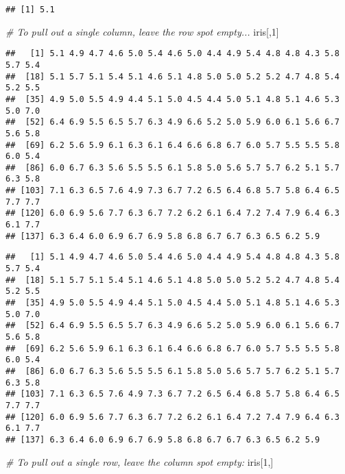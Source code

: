 \documentclass[]{article}
\newenvironment{Shaded}{\begin{snugshade}}{\end{snugshade}}
\newcommand{\DecValTok}[1]{\textcolor[rgb]{0.00,0.00,0.81}{#1}}
\newcommand{\CommentTok}[1]{\textcolor[rgb]{0.56,0.35,0.01}{\textit{#1}}}
\newcommand{\OperatorTok}[1]{\textcolor[rgb]{0.81,0.36,0.00}{\textbf{#1}}}
\newcommand{\NormalTok}[1]{#1}
\begin{document}
\begin{verbatim}
## [1] 5.1
\end{verbatim}

\begin{Shaded}
\begin{Highlighting}[]
\CommentTok{# To pull out a single column, leave the row spot empty...}
\NormalTok{iris[,}\DecValTok{1}\NormalTok{]}
\end{Highlighting}
\end{Shaded}

\begin{verbatim}
##   [1] 5.1 4.9 4.7 4.6 5.0 5.4 4.6 5.0 4.4 4.9 5.4 4.8 4.8 4.3 5.8 5.7 5.4
##  [18] 5.1 5.7 5.1 5.4 5.1 4.6 5.1 4.8 5.0 5.0 5.2 5.2 4.7 4.8 5.4 5.2 5.5
##  [35] 4.9 5.0 5.5 4.9 4.4 5.1 5.0 4.5 4.4 5.0 5.1 4.8 5.1 4.6 5.3 5.0 7.0
##  [52] 6.4 6.9 5.5 6.5 5.7 6.3 4.9 6.6 5.2 5.0 5.9 6.0 6.1 5.6 6.7 5.6 5.8
##  [69] 6.2 5.6 5.9 6.1 6.3 6.1 6.4 6.6 6.8 6.7 6.0 5.7 5.5 5.5 5.8 6.0 5.4
##  [86] 6.0 6.7 6.3 5.6 5.5 5.5 6.1 5.8 5.0 5.6 5.7 5.7 6.2 5.1 5.7 6.3 5.8
## [103] 7.1 6.3 6.5 7.6 4.9 7.3 6.7 7.2 6.5 6.4 6.8 5.7 5.8 6.4 6.5 7.7 7.7
## [120] 6.0 6.9 5.6 7.7 6.3 6.7 7.2 6.2 6.1 6.4 7.2 7.4 7.9 6.4 6.3 6.1 7.7
## [137] 6.3 6.4 6.0 6.9 6.7 6.9 5.8 6.8 6.7 6.7 6.3 6.5 6.2 5.9
\end{verbatim}

\begin{Shaded}
\end{Shaded}

\begin{verbatim}
##   [1] 5.1 4.9 4.7 4.6 5.0 5.4 4.6 5.0 4.4 4.9 5.4 4.8 4.8 4.3 5.8 5.7 5.4
##  [18] 5.1 5.7 5.1 5.4 5.1 4.6 5.1 4.8 5.0 5.0 5.2 5.2 4.7 4.8 5.4 5.2 5.5
##  [35] 4.9 5.0 5.5 4.9 4.4 5.1 5.0 4.5 4.4 5.0 5.1 4.8 5.1 4.6 5.3 5.0 7.0
##  [52] 6.4 6.9 5.5 6.5 5.7 6.3 4.9 6.6 5.2 5.0 5.9 6.0 6.1 5.6 6.7 5.6 5.8
##  [69] 6.2 5.6 5.9 6.1 6.3 6.1 6.4 6.6 6.8 6.7 6.0 5.7 5.5 5.5 5.8 6.0 5.4
##  [86] 6.0 6.7 6.3 5.6 5.5 5.5 6.1 5.8 5.0 5.6 5.7 5.7 6.2 5.1 5.7 6.3 5.8
## [103] 7.1 6.3 6.5 7.6 4.9 7.3 6.7 7.2 6.5 6.4 6.8 5.7 5.8 6.4 6.5 7.7 7.7
## [120] 6.0 6.9 5.6 7.7 6.3 6.7 7.2 6.2 6.1 6.4 7.2 7.4 7.9 6.4 6.3 6.1 7.7
## [137] 6.3 6.4 6.0 6.9 6.7 6.9 5.8 6.8 6.7 6.7 6.3 6.5 6.2 5.9
\end{verbatim}

\begin{Shaded}
\begin{Highlighting}[]
\CommentTok{# To pull out a single row, leave the column spot empty:}
\NormalTok{iris[}\DecValTok{1}\NormalTok{,]}
\end{Highlighting}
\end{Shaded}
\end{document}
